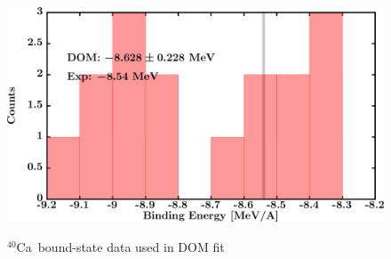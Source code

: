 \documentclass[twocolumn,secnumarabic,amssymb, nobibnotes, aps, prl,
superscriptaddress, nobalancelastpage, draft]{revtex4}
\newcommand{\caForty}{\ensuremath{^{40}}C\lowercase{a}}
\begin{document}
\begin{figure}[!htb]
\begin{minipage}{0.4\linewidth}
        \label{DOM_ca40_RMSRadius}
    \end{minipage}
    \begin{minipage}{0.4\linewidth}
        \centering
        \includegraphics[width=\linewidth]{figures/ca40_BE.png}
        \label{DOM_ca40_BE}
    \end{minipage}
    \caption{\caForty\ bound-state data used in DOM fit}
    \label{DOM_ca40_structural}
\end{figure}
\end{document}
